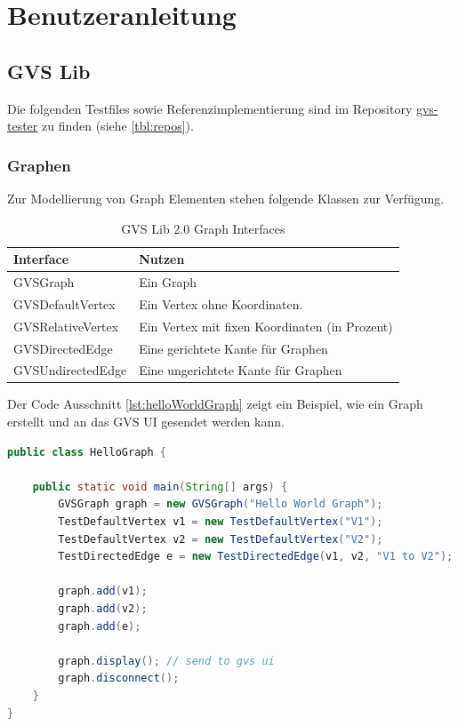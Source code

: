\documentclass[11pt,a4paper,english,oneside]{book}
\numberwithin{equation}{chapter}
\begin{document}
	\clearpage
	


	
	
	\chapter{Benutzeranleitung}
	\section{GVS Lib}
	Die folgenden Testfiles sowie Referenzimplementierung sind im Repository \href{https://github.com/Graphs-Visualization-Service/gvs-tester}{gvs-tester} zu finden (siehe \ref{tbl:repos}).
	
	
	\subsection{Graphen}
	Zur Modellierung von Graph Elementen stehen folgende Klassen zur Verfügung.

	\begin{table}[h!]
		\centering
		\begin{tabularx}{\linewidth}{l l}
			\toprule 
			Interface & Nutzen \\
			\midrule
			GVSGraph & Ein Graph \\
			GVSDefaultVertex & Ein Vertex ohne Koordinaten. \\
			GVSRelativeVertex & Ein Vertex mit fixen Koordinaten (in Prozent) \\
			GVSDirectedEdge & Eine gerichtete Kante für Graphen \\
			GVSUndirectedEdge & Eine ungerichtete Kante für Graphen \\
			\bottomrule 
		\end{tabularx} 
		\caption{GVS Lib 2.0 Graph Interfaces} 
		\label{tbl:Interfaces}
	\end{table}
	
	\clearpage
	\noindent
	Der Code Ausschnitt \ref{lst:helloWorldGraph} zeigt ein Beispiel, wie ein Graph erstellt und an das GVS UI gesendet werden kann.
\begin{lstlisting}[language=java, frame=single, caption={Hello World Graph}, label={lst:helloWorldGraph}]
public class HelloGraph {

	public static void main(String[] args) {
		GVSGraph graph = new GVSGraph("Hello World Graph");
		TestDefaultVertex v1 = new TestDefaultVertex("V1");
		TestDefaultVertex v2 = new TestDefaultVertex("V2");
		TestDirectedEdge e = new TestDirectedEdge(v1, v2, "V1 to V2");
		
		graph.add(v1);
		graph.add(v2);
		graph.add(e);
		
		graph.display(); // send to gvs ui
		graph.disconnect();
	}
}
\end{lstlisting}	
	
\end{document}
